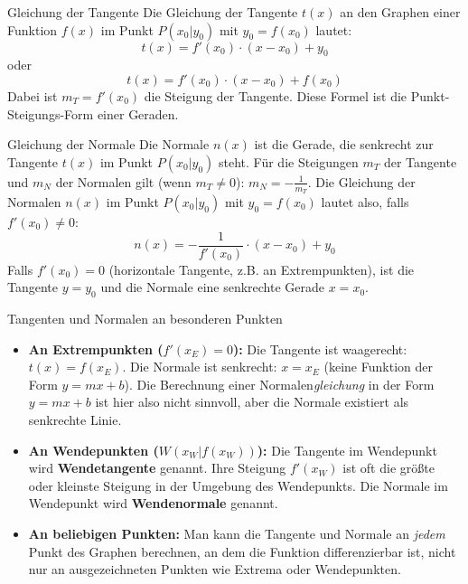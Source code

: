 \begin{merksatzumgebung}{Gleichung der Tangente}
Die Gleichung der Tangente $t(x)$ an den Graphen einer Funktion $f(x)$ im Punkt $P(x_0|y_0)$ mit $y_0=f(x_0)$ lautet:
\[ t(x) = f'(x_0) \cdot (x - x_0) + y_0 \]
oder
\[ t(x) = f'(x_0) \cdot (x - x_0) + f(x_0) \]
Dabei ist $m_T = f'(x_0)$ die Steigung der Tangente. Diese Formel ist die Punkt-Steigungs-Form einer Geraden.
\end{merksatzumgebung}

\begin{merksatzumgebung}{Gleichung der Normale}
Die Normale $n(x)$ ist die Gerade, die senkrecht zur Tangente $t(x)$ im Punkt $P(x_0|y_0)$ steht.
Für die Steigungen $m_T$ der Tangente und $m_N$ der Normalen gilt (wenn $m_T \neq 0$): $m_N = -\frac{1}{m_T}$.
Die Gleichung der Normalen $n(x)$ im Punkt $P(x_0|y_0)$ mit $y_0=f(x_0)$ lautet also, falls $f'(x_0) \neq 0$:
\[ n(x) = -\frac{1}{f'(x_0)} \cdot (x - x_0) + y_0 \]
Falls $f'(x_0) = 0$ (horizontale Tangente, z.B. an Extrempunkten), ist die Tangente $y=y_0$ und die Normale eine senkrechte Gerade $x=x_0$.
\end{merksatzumgebung}

\begin{tippumgebung}{Tangenten und Normalen an besonderen Punkten}
\begin{itemize}
    \item \textbf{An Extrempunkten ($f'(x_E)=0$):}
        Die Tangente ist waagerecht: $t(x) = f(x_E)$.
        Die Normale ist senkrecht: $x = x_E$ (keine Funktion der Form $y=mx+b$).
        Die Berechnung einer Normalen\textit{gleichung} in der Form $y=mx+b$ ist hier also nicht sinnvoll, aber die Normale existiert als senkrechte Linie.
    \item \textbf{An Wendepunkten ($W(x_W|f(x_W))$):}
        Die Tangente im Wendepunkt wird \textbf{Wendetangente} genannt. Ihre Steigung $f'(x_W)$ ist oft die größte oder kleinste Steigung in der Umgebung des Wendepunkts.
        Die Normale im Wendepunkt wird \textbf{Wendenormale} genannt.
    \item \textbf{An beliebigen Punkten:} Man kann die Tangente und Normale an \textit{jedem} Punkt des Graphen berechnen, an dem die Funktion differenzierbar ist, nicht nur an ausgezeichneten Punkten wie Extrema oder Wendepunkten.
\end{itemize}
\end{tippumgebung}

